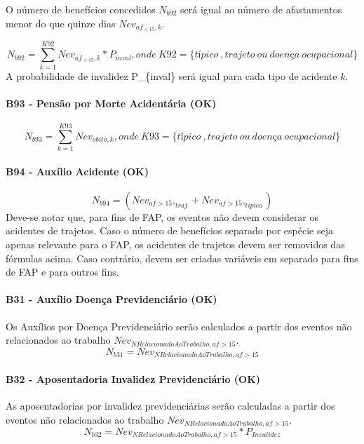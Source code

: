 \documentclass[]{article}
\let\oldparagraph\paragraph
\renewcommand{\paragraph}[1]{\oldparagraph{#1}\mbox{}}
\begin{document}
O número de benefícios concedidos \(N_{b92}\) será igual ao número de
afastamentos menor do que quinze dias \(Nev_{af_{<15},k}\).

\[N_{b92} = \sum_{k=1}^{K92}{Nev_{af_{>15},k}}  * P_{inval} , onde \ K92 = \{típico \ , trajeto \  ou \ doença \ ocupacional\} \]
A probabilidade de invalidez P\_\{inval\} será igual para cada tipo de
acidente \(k\).

\paragraph{B93 - Pensão por Morte Acidentária
(OK)}\label{b93---pensao-por-morte-acidentaria-ok}

\[N_{b93} = \sum_{k=1}^{K93}Nev_{obito, k}, onde \ K93 = \{típico \ , trajeto \  ou \ doença \ ocupacional\}\]

\paragraph{B94 - Auxílio Acidente (OK)}\label{b94---auxilio-acidente-ok}

\[N_{b94} = (Nev_{af>15},_{traj} + Nev_{af>15},_{tipico})\] Deve-se
notar que, para fins de FAP, os eventos não devem considerar os
acidentes de trajetos. Caso o número de benefícios separado por espécie
seja apenas relevante para o FAP, os acidentes de trajetos devem ser
removidos das fórmulas acima. Caso contrário, devem ser criadas
variáveis em separado para fins de FAP e para outros fins.

\paragraph{B31 - Auxílio Doença Previdenciário
(OK)}\label{b31---auxilio-doenca-previdenciario-ok}

Os Auxílios por Doença Previdenciário serão calculados a partir dos
eventos não relacionados ao trabalho
\(Nev_{NRelacionadoAoTrabalho, af>15}\).
\[N_{b31} = Nev_{NRelacionadoAoTrabalho, af>15}\]

\paragraph{B32 - Aposentadoria Invalidez Previdenciário
(OK)}\label{b32---aposentadoria-invalidez-previdenciario-ok}

As aposentadorias por invalidez previdenciárias serão calculadas a
partir dos eventos não relacionados ao trabalho
\(Nev_{NRelacionadoAoTrabalho, af>15}\).
\[N_{b32} = Nev_{NRelacionadoAoTrabalho, af>15} * P_{Invalidez}\]
\end{document}
